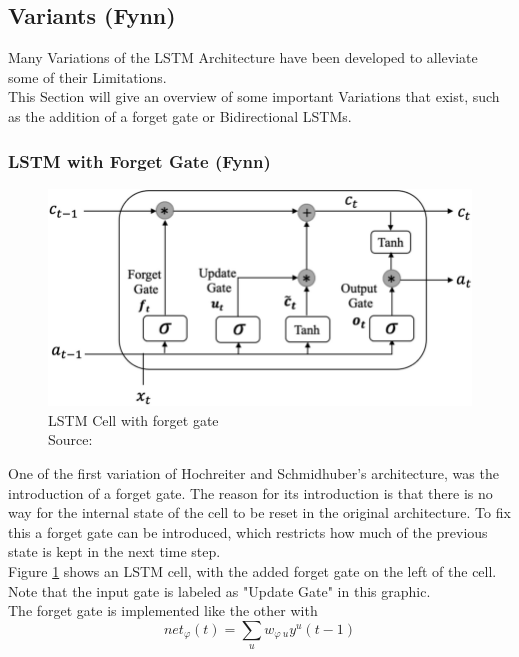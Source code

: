 \documentclass[twoside,a4paper,10pt,DIV=12,BCOR=12mm]{scrartcl}
\begin{document}
\subsection{Variants (Fynn)}

Many Variations of the LSTM Architecture have been developed to alleviate some of their Limitations. \\
This Section will give an overview of some important Variations that exist, such as the addition of a forget gate or Bidirectional LSTMs.

\subsubsection{LSTM with Forget Gate (Fynn)}
\begin{figure}[h!]
    \centering
    \includegraphics[width=0.75\linewidth]{Structure-of-LSTM-cell-which-introduces-three-special-gates-Input-Gate-i-Forget-Gate.png}
    \caption{LSTM Cell with forget gate\\ Source: \cite{nguyen2022lstmforgetgraphic}}
    \label{fig:lstm-forget}
\end{figure}
One of the first variation of Hochreiter and Schmidhuber's architecture, was the introduction of a forget gate. The reason for its introduction is that there is no way for the internal state of the cell to be reset in the original architecture. To fix this a forget gate can be introduced, which restricts how much of the previous state is kept in the next time step.\cite{gers1999forgetgate}\\
Figure \ref{fig:lstm-forget} shows an LSTM cell, with the added forget gate on the left of the cell. Note that the input gate is labeled as "Update Gate" in this graphic.\\
The forget gate is implemented like the other with\cite{gers1999forgetgate}
\begin{equation}
    net_\varphi(t)=\sum_uw_{\varphi\ u}y^u(t-1)
    \label{eqn:forget-net-in}
\end{equation}
\end{document}
